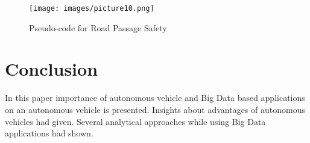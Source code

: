 \documentclass{acmart}
\begin{document}
\begin{figure}[!ht]
  \centering
      \texttt{[image: images/picture10.png]}
  \caption{Pseudo-code for Road Passage Safety}\label{F:pseudo-code}
\end{figure}

\section{Conclusion}
    In this paper importance of autonomous vehicle and Big Data based applications on an autonomous vehicle is presented. Insights about advantages of autonomous vehicles had given. Several analytical approaches while using Big Data applications had shown.






\end{document}

